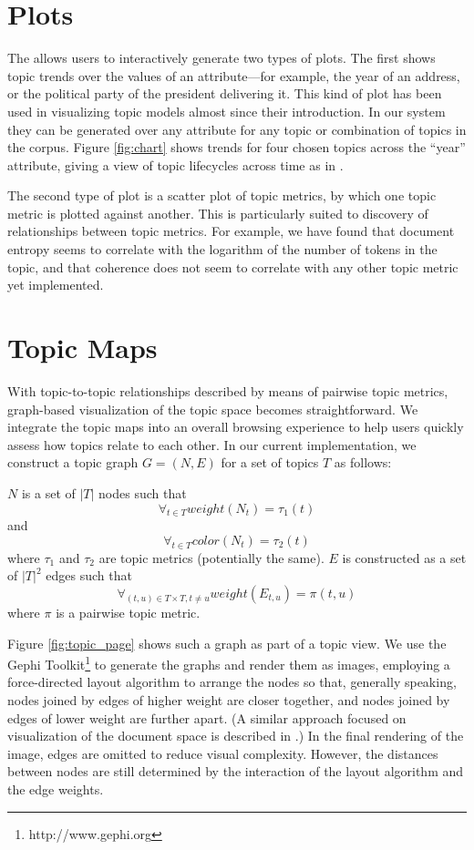 \documentclass[11pt]{article}
\begin{document}
\section{Plots}\label{sec:plots}
The \tool{} allows users to interactively generate two types of plots. The first
shows topic trends over the values of an attribute---for example, the year
of an address, or the political party of the president delivering it. This kind
of plot has been used in visualizing topic models almost since their
introduction. In our system they can be generated over any attribute for any
topic or combination of topics in the corpus. Figure \ref{fig:chart} shows
trends for four chosen topics across the ``year'' attribute, giving a view
of topic lifecycles across time as in \cite{Griffiths2004,Wang2006}.

The second type of plot is a scatter plot of topic metrics, by which one topic
metric is plotted against another. This is particularly suited to discovery of
relationships between topic metrics. For example, we have found that document
entropy seems to correlate with the logarithm of the number of tokens in the
topic, and that coherence does not seem to correlate with any other topic metric
yet implemented.

\section{Topic Maps}\label{sec:maps}
With topic-to-topic relationships described by means of pairwise topic metrics,
graph-based visualization of the topic space becomes straightforward. We
integrate the topic maps into an overall browsing experience to help users
quickly assess how topics relate to each other. In our current implementation, we
construct a topic graph $G = (N, E)$ for a set of topics $T$ as follows:

$N$ is a set of $|T|$ nodes such that
\[\forall_{t\in T} weight(N_{t}) = \tau_{1}(t)\]
and
\[\forall_{t\in T} color(N_{t}) = \tau_{2}(t)\]
where $\tau_1$ and $\tau_2$ are topic metrics (potentially the same). $E$ is
constructed as a set of $|T|^2$ edges such that
  \[\forall_{(t,u)\in T\times T, t\neq u} weight(E_{t,u}) = \pi(t,u)\]
where $\pi$ is a pairwise topic metric.

Figure \ref{fig:topic_page} shows such a graph as part of a topic view. We use
the Gephi Toolkit\footnote{http://www.gephi.org} to generate the graphs and
render them as images, employing a force-directed layout algorithm to arrange
the nodes so that, generally speaking, nodes joined by edges of higher weight
are closer together, and nodes joined by edges of lower weight are further
apart. (A similar approach focused on visualization of the document space is
described in \cite{Newman2010Maps}.) In the final rendering of the image, edges
are omitted to reduce visual complexity. However, the distances between nodes
are still determined by the interaction of the layout algorithm and the edge
weights.
\end{document}
